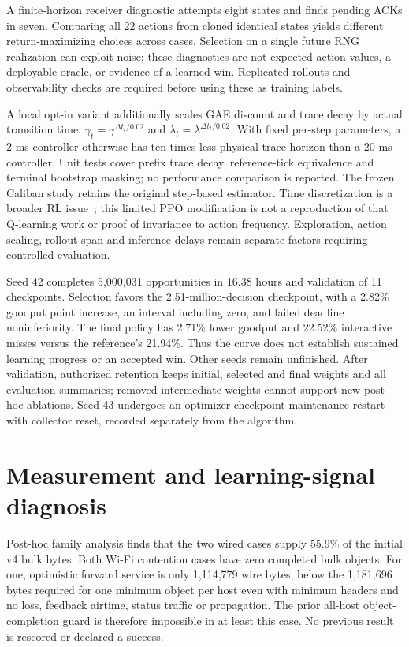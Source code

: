 \documentclass[11pt]{article}
\begin{document}
A finite-horizon receiver diagnostic attempts eight states and finds pending ACKs
in seven. Comparing all 22 actions from cloned identical states yields different
return-maximizing choices across cases. Selection on a single future RNG
realization can exploit noise; these diagnostics are not expected action values,
a deployable oracle, or evidence of a learned win. Replicated rollouts and
observability checks are required before using these as training labels.

A local opt-in variant additionally scales GAE discount and trace decay by
actual transition time: $\gamma_t=\gamma^{\Delta t_t/0.02}$ and
$\lambda_t=\lambda^{\Delta t_t/0.02}$. With fixed per-step parameters, a 2-ms
controller otherwise has ten times less physical trace horizon than a 20-ms
controller. Unit tests cover prefix trace decay, reference-tick equivalence and
terminal bootstrap masking; no performance comparison is reported. The frozen
Caliban study retains the original step-based estimator. Time discretization is
a broader RL issue~\cite{tallec2019time}; this limited PPO modification is not a
reproduction of that Q-learning work or proof of invariance to action frequency.
Exploration, action scaling, rollout span and inference delays remain separate
factors requiring controlled evaluation.

Seed 42 completes 5,000,031 opportunities in 16.38 hours and validation of
11 checkpoints. Selection favors the 2.51-million-decision checkpoint, with a
2.82\% goodput point increase, an interval including zero, and failed deadline
noninferiority. The final policy has 2.71\% lower goodput and 22.52\% interactive
misses versus the reference's 21.94\%. Thus the curve does not establish sustained
learning progress or an accepted win. Other seeds remain unfinished. After
validation, authorized retention keeps initial, selected and final weights and
all evaluation summaries; removed intermediate weights cannot support new
post-hoc ablations. Seed 43 undergoes an optimizer-checkpoint maintenance restart
with collector reset, recorded separately from the algorithm.

\section{Measurement and learning-signal diagnosis}
Post-hoc family analysis finds that the two wired cases supply 55.9\% of the
initial v4 bulk bytes. Both Wi-Fi contention cases have zero completed bulk
objects. For one, optimistic forward service is only 1,114,779 wire bytes, below
the 1,181,696 bytes required for one minimum object per host even with minimum
headers and no loss, feedback airtime, status traffic or propagation. The prior
all-host object-completion guard is therefore impossible in at least this case.
No previous result is rescored or declared a success.
\end{document}
